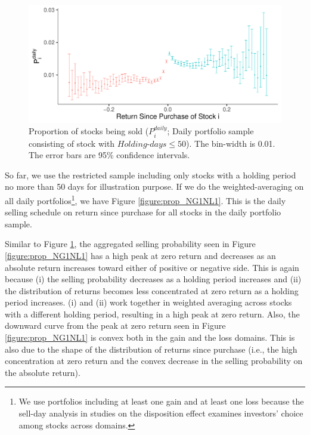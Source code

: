 \documentclass[11pt, a4paper]{article}
\begin{document}
\begin{figure}[H]
	\centering
	\includegraphics[width=0.8\columnwidth]{barc_schedule_daily_less50_3.pdf}
	\caption{\small Proportion of stocks being sold ($P^{daily}_{i}$; Daily portfolio sample consisting of stock with $Holding\mbox{-}days\leq50$). The bin-width is 0.01. The error bars are 95\% confidence intervals.}
	\label{figure:prop_less50}
\end{figure}


So far, we use the restricted sample including only stocks with a holding period no more than 50 days for illustration purpose.
If we do the weighted-averaging on all daily portfolios\footnote{We use portfolios including at least one gain and at least one loss because the sell-day analysis in studies on the disposition effect examines investors' choice among stocks across domains.}, we have Figure \ref{figure:prop_NG1NL1}. This is the daily selling schedule on return since purchase for all stocks in the daily portfolio sample. 

Similar to Figure \ref{figure:prop_less50}, the aggregated selling probability seen in Figure \ref{figure:prop_NG1NL1} has a high peak at zero return and decreases as an absolute return increases toward either of positive or negative side. This is again because (i) the selling probability decreases as a holding period increases and (ii) the distribution of returns becomes less concentrated at zero return as a holding period increases. (i) and (ii) work together in weighted averaging across stocks with a different holding period, resulting in a high peak at zero return. Also, the downward curve from the peak at zero return seen in Figure \ref{figure:prop_NG1NL1} is convex both in the gain and the loss domains. This is also due to the shape of the distribution of returns since purchase (i.e., the high concentration at zero return and the convex decrease in the selling probability on the absolute return).
\end{document}
